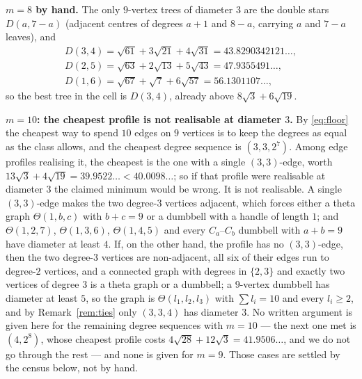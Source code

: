 \documentclass[11pt]{amsart}
\theoremstyle{remark}
\begin{document}
\medskip
\noindent\textbf{$m=8$ by hand.} The only $9$-vertex trees of diameter $3$ are
the double stars $D(a,7-a)$ (adjacent centres of degrees $a+1$ and $8-a$,
carrying $a$ and $7-a$ leaves), and
\[
 \begin{array}{l}
 D(3,4)=\sqrt{61}+3\sqrt{21}+4\sqrt{31}=43.8290342121\ldots,\\
 D(2,5)=\sqrt{63}+2\sqrt{13}+5\sqrt{43}=47.9355491\ldots,\\
 D(1,6)=\sqrt{67}+\sqrt7+6\sqrt{57}=56.1301107\ldots,
 \end{array}
\]
so the best tree in the cell is $D(3,4)$, already above
$8\sqrt3+6\sqrt{19}$.

\medskip
\noindent\textbf{$m=10$: the cheapest profile is not realisable at diameter
$3$.}
By \eqref{eq:floor} the cheapest way to spend $10$ edges on $9$ vertices is to
keep the degrees as equal as the class allows, and the cheapest degree sequence
is $(3,3,2^7)$. Among edge profiles realising it, the cheapest is the one with
a single $(3,3)$-edge, worth
$13\sqrt3+4\sqrt{19}=39.9522\ldots<40.0098\ldots$; so if that profile were
realisable at diameter $3$ the claimed minimum would be wrong. It is not
realisable. A single $(3,3)$-edge makes the two degree-$3$ vertices adjacent,
which forces either a theta graph $\Theta(1,b,c)$ with $b+c=9$ or a dumbbell
with a handle of length $1$; and $\Theta(1,2,7)$, $\Theta(1,3,6)$,
$\Theta(1,4,5)$ and every $C_a$--$C_b$ dumbbell with $a+b=9$ have diameter at
least $4$. If, on the other hand, the profile has no
$(3,3)$-edge, then the two degree-$3$ vertices are non-adjacent, all six of
their edges run to degree-$2$ vertices, and a connected graph with degrees in
$\{2,3\}$ and exactly two vertices of degree $3$ is a theta graph or a
dumbbell; a $9$-vertex dumbbell has diameter at least $5$, so the graph is
$\Theta(l_1,l_2,l_3)$ with $\sum l_i=10$ and every $l_i\ge2$, and by
Remark~\ref{rem:ties} only $(3,3,4)$ has diameter $3$.
No written argument is given here for the remaining degree sequences with
$m=10$ --- the next one met is $(4,2^8)$, whose cheapest profile costs
$4\sqrt{28}+12\sqrt3=41.9506\ldots$, and we do not go through the rest --- and
none is given for $m=9$. Those cases are settled by the census below, not by
hand.
\end{document}
